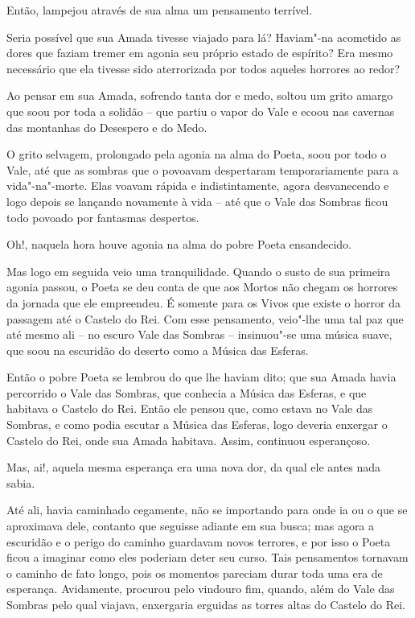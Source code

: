 Então, lampejou através de sua alma um pensamento terrível.

Seria possível que sua Amada tivesse viajado para lá? Haviam"-na
acometido as dores que faziam tremer em agonia seu próprio estado de
espírito? Era mesmo necessário que ela tivesse sido aterrorizada por
todos aqueles horrores ao redor?

Ao pensar em sua Amada, sofrendo tanta dor e medo, soltou um grito
amargo que soou por toda a solidão -- que partiu o vapor do Vale e ecoou
nas cavernas das montanhas do Desespero e do Medo.

O grito selvagem, prolongado pela agonia na alma do Poeta, soou por todo
o Vale, até que as sombras que o povoavam despertaram temporariamente
para a vida"-na"-morte. Elas voavam rápida e indistintamente, agora
desvanecendo e logo depois se lançando novamente à vida -- até que o
Vale das Sombras ficou todo povoado por fantasmas despertos.

Oh!, naquela hora houve agonia na alma do pobre Poeta ensandecido.

Mas logo em seguida veio uma tranquilidade. Quando o susto de sua
primeira agonia passou, o Poeta se deu conta de que aos Mortos não
chegam os horrores da jornada que ele empreendeu. É somente para os
Vivos que existe o horror da passagem até o Castelo do Rei. Com esse
pensamento, veio"-lhe uma tal paz que até mesmo ali -- no escuro Vale das
Sombras -- insinuou"-se uma música suave, que soou na escuridão do
deserto como a Música das Esferas.

Então o pobre Poeta se lembrou do que lhe haviam dito; que sua Amada
havia percorrido o Vale das Sombras, que conhecia a Música das Esferas,
e que habitava o Castelo do Rei. Então ele pensou que, como estava no
Vale das Sombras, e como podia escutar a Música das Esferas, logo
deveria enxergar o Castelo do Rei, onde sua Amada habitava. Assim,
continuou esperançoso.

Mas, ai!, aquela mesma esperança era uma nova dor, da qual ele antes nada sabia.

Até ali, havia caminhado cegamente, não se importando para onde
ia ou o que se aproximava dele, contanto que seguisse adiante em sua
busca; mas agora a escuridão e o perigo do caminho guardavam novos
terrores, e por isso o Poeta ficou a imaginar como eles poderiam deter
seu curso. Tais pensamentos tornavam o caminho de fato longo, pois os
momentos pareciam durar toda uma era de esperança. Avidamente, procurou
pelo vindouro fim, quando, além do Vale das Sombras pelo qual
viajava, enxergaria erguidas as torres altas do Castelo do Rei.

